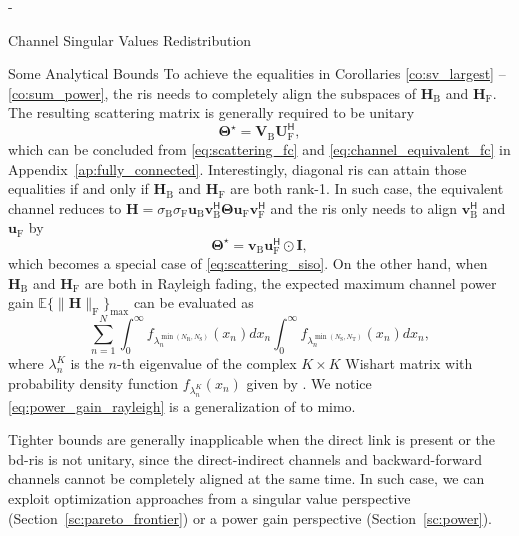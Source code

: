 \begin{section}{-}
\begin{subsection}{Channel Singular Values Redistribution}
\begin{subsubsection}{Some Analytical Bounds}
			To achieve the equalities in Corollaries \eqref{co:sv_largest} -- \eqref{co:sum_power}, the \gls{ris} needs to completely align the subspaces of $\mathbf{H}_\mathrm{B}$ and $\mathbf{H}_\mathrm{F}$.
			The resulting scattering matrix is generally required to be unitary
			\begin{equation}
				\mathbf{\Theta}^\star = \mathbf{V}_\mathrm{B} \mathbf{U}_\mathrm{F}^\mathsf{H},
				\label{eq:scattering_fc_optimal}
			\end{equation}
			which can be concluded from \eqref{eq:scattering_fc} and \eqref{eq:channel_equivalent_fc} in Appendix~\ref{ap:fully_connected}.
			Interestingly, diagonal \gls{ris} can attain those equalities if and only if $\mathbf{H}_\mathrm{B}$ and $\mathbf{H}_\mathrm{F}$ are both rank-1.
			In such case, the equivalent channel reduces to $\mathbf{H} = \sigma_\mathrm{B} \sigma_\mathrm{F} \mathbf{u}_\mathrm{B} \mathbf{v}_\mathrm{B}^\mathsf{H} \mathbf{\Theta} \mathbf{u}_\mathrm{F} \mathbf{v}_\mathrm{F}^\mathsf{H}$ and the \gls{ris} only needs to align $\mathbf{v}_\mathrm{B}^\mathsf{H}$ and $\mathbf{u}_\mathrm{F}$ by
			\begin{equation}
				\mathbf{\Theta}^\star = \mathbf{v}_\mathrm{B} \mathbf{u}_\mathrm{F}^\mathsf{H} \odot \mathbf{I},
			\end{equation}
			which becomes a special case of \eqref{eq:scattering_siso}.
			On the other hand, when $\mathbf{H}_\mathrm{B}$ and $\mathbf{H}_\mathrm{F}$ are both in Rayleigh fading, the expected maximum channel power gain $\mathbb{E}\bigl\{ \lVert \mathbf{H} \rVert _ \mathrm{F} \bigr\}_{\max}$ can be evaluated as
			\begin{equation}
				\sum_{n=1}^N \int_0^\infty f_{\lambda_n^{\min(N_\mathrm{R},N_\mathrm{S})}}(x_n) d x_n \int_0^\infty f_{\lambda_n^{\min(N_\mathrm{S},N_\mathrm{T})}}(x_n) d x_n,
				\label{eq:power_gain_rayleigh}
			\end{equation}
			where $\lambda_n^{K}$ is the $n$-th eigenvalue of the complex $K \times K$ Wishart matrix with probability density function $f_{\lambda_n^{K}}(x_n)$ given by \cite[Equation 51]{Zanella2009}.
			We notice \eqref{eq:power_gain_rayleigh} is a generalization of \cite[Equation 58]{Shen2020a} to \gls{mimo}.

			Tighter bounds are generally inapplicable when the direct link is present or the \gls{bd}-\gls{ris} is not unitary, since the direct-indirect channels and backward-forward channels cannot be completely aligned at the same time.
			In such case, we can exploit optimization approaches from a singular value perspective (Section~\ref{sc:pareto_frontier}) or a power gain perspective (Section~\ref{sc:power}).
		\end{subsubsection}
	\end{subsection}


\end{section}
